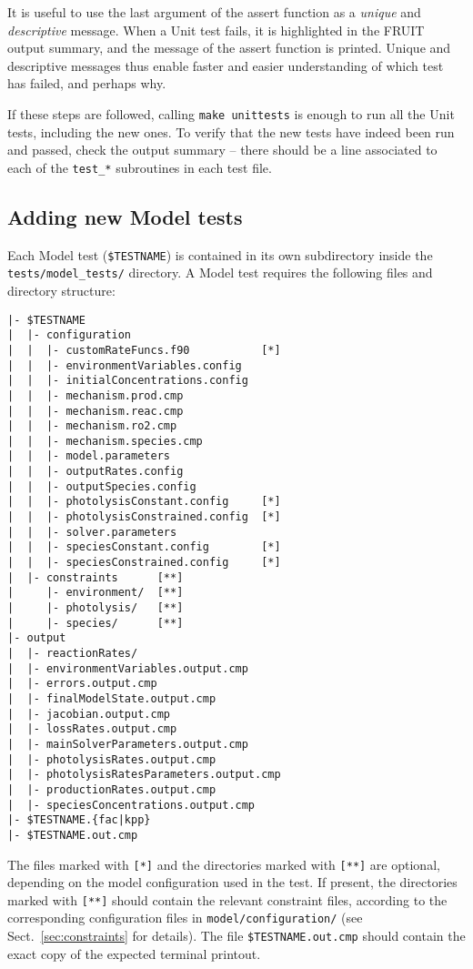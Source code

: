 It is useful to use the last argument of the assert function as a
\emph{unique} and \emph{descriptive} message. When a Unit test fails,
it is highlighted in the FRUIT output summary, and the message of the
assert function is printed. Unique and descriptive messages thus
enable faster and easier understanding of which test has failed,
and perhaps why.

If these steps are followed, calling \texttt{make\ unittests} is
enough to run all the Unit tests, including the new ones. To verify
that the new tests have indeed been run and passed, check the output
summary -- there should be a line associated to each of the
\texttt{test\_*} subroutines in each test file.

\subsection{Adding new Model tests} \label{subsec:adding-new-model-tests}

Each Model test (\texttt{\$TESTNAME}) is contained in its own
subdirectory inside the \texttt{tests/model\_tests/} directory. A
Model test requires the following files and directory structure:

\begin{verbatim}
|- $TESTNAME
|  |- configuration
|  |  |- customRateFuncs.f90           [*]
|  |  |- environmentVariables.config
|  |  |- initialConcentrations.config
|  |  |- mechanism.prod.cmp
|  |  |- mechanism.reac.cmp
|  |  |- mechanism.ro2.cmp
|  |  |- mechanism.species.cmp
|  |  |- model.parameters
|  |  |- outputRates.config
|  |  |- outputSpecies.config
|  |  |- photolysisConstant.config     [*]
|  |  |- photolysisConstrained.config  [*]
|  |  |- solver.parameters
|  |  |- speciesConstant.config        [*]
|  |  |- speciesConstrained.config     [*]
|  |- constraints      [**]
|     |- environment/  [**]
|     |- photolysis/   [**]
|     |- species/      [**]
|- output
|  |- reactionRates/
|  |- environmentVariables.output.cmp
|  |- errors.output.cmp
|  |- finalModelState.output.cmp
|  |- jacobian.output.cmp
|  |- lossRates.output.cmp
|  |- mainSolverParameters.output.cmp
|  |- photolysisRates.output.cmp
|  |- photolysisRatesParameters.output.cmp
|  |- productionRates.output.cmp
|  |- speciesConcentrations.output.cmp
|- $TESTNAME.{fac|kpp}
|- $TESTNAME.out.cmp
\end{verbatim}

The files marked with \texttt{[*]} and the directories marked with
\texttt{[**]} are optional, depending on the model configuration used
in the test. If present, the directories marked with \texttt{[**]}
should contain the relevant constraint files, according to the
corresponding configuration files in \texttt{model/configuration/}
(see Sect.~\ref{sec:constraints} for details). The file
\texttt{\$TESTNAME.out.cmp} should contain the exact copy of the
expected terminal printout.

